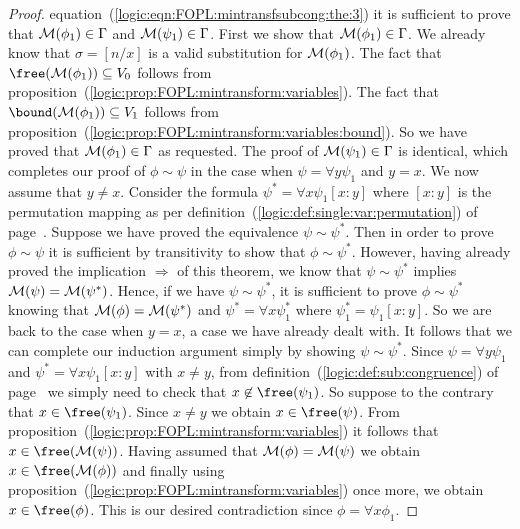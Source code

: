\begin{proof}
equation~(\ref{logic:eqn:FOPL:mintransfsubcong:the:3}) it is
sufficient to prove that ${\cal M}(\phi_{1})\in\Gamma$ and ${\cal
M}(\psi_{1})\in\Gamma$. First we show that ${\cal
M}(\phi_{1})\in\Gamma$. We already know that $\sigma=[n/x]$ is a
valid substitution for ${\cal M}(\phi_{1})$. The fact that
$\free({\cal M}(\phi_{1}))\subseteq V_{0}$ follows from
proposition~(\ref{logic:prop:FOPL:mintransform:variables}). The fact
that $\bound({\cal M}(\phi_{1}))\subseteq V_{1}$ follows from
proposition~(\ref{logic:prop:FOPL:mintransform:variables:bound}). So
we have proved that ${\cal M}(\phi_{1})\in\Gamma$ as requested. The
proof of ${\cal M}(\psi_{1})\in\Gamma$ is identical, which completes
our proof of $\phi\sim\psi$ in the case when $\psi=\forall
y\psi_{1}$ and $y=x$. We now assume that $y\neq x$. Consider the
formula $\psi^{*}=\forall x\psi_{1}[x\!:\!y]$ where $[x\!:\!y]$ is
the permutation mapping as per
definition~(\ref{logic:def:single:var:permutation}) of
page~\pageref{logic:def:single:var:permutation}. Suppose we have
proved the equivalence $\psi\sim\psi^{*}$. Then in order to prove
$\phi\sim\psi$ it is sufficient by transitivity to show that
$\phi\sim\psi^{*}$. However, having already proved the implication
$\Rightarrow$ of this theorem, we know that $\psi\sim\psi^{*}$
implies ${\cal M}(\psi)={\cal M}(\psi^{*})$. Hence, if we have
$\psi\sim\psi^{*}$, it is sufficient to prove $\phi\sim\psi^{*}$
knowing that ${\cal M}(\phi)={\cal M}(\psi^{*})$ and
$\psi^{*}=\forall x\psi_{1}^{*}$ where
$\psi_{1}^{*}=\psi_{1}[x\!:\!y]$. So we are back to the case when
$y=x$, a case we have already dealt with. It follows that we can
complete our induction argument simply by showing
$\psi\sim\psi^{*}$. Since $\psi=\forall y\psi_{1}$ and
$\psi^{*}=\forall x\psi_{1}[x\!:\!y]$ with $x\neq y$, from
definition~(\ref{logic:def:sub:congruence}) of
page~\pageref{logic:def:sub:congruence} we simply need to check that
$x\not\in\free(\psi_{1})$. So suppose to the contrary that
$x\in\free(\psi_{1})$. Since $x\neq y$ we obtain $x\in\free(\psi)$.
From proposition~(\ref{logic:prop:FOPL:mintransform:variables}) it
follows that $x\in\free({\cal M}(\psi))$. Having assumed that ${\cal
M}(\phi)={\cal M}(\psi)$ we obtain $x\in\free({\cal M}(\phi))$ and
finally using
proposition~(\ref{logic:prop:FOPL:mintransform:variables}) once
more, we obtain $x\in\free(\phi)$. This is our desired contradiction
since $\phi=\forall x\phi_{1}$.
\end{proof}

